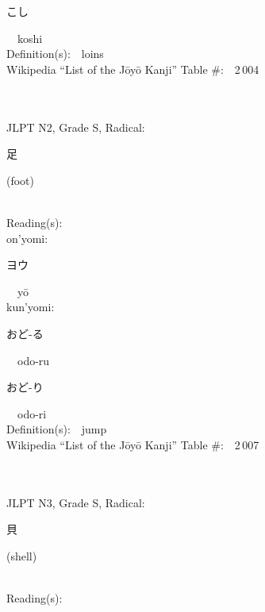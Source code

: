 \begin{multicols}{2}
{\hspace*{2em}}{\begin{CJK}{UTF8}{min} こし \end{CJK}}\ \ koshi\ \ \\
Definition(s):\ \ loins \\
Wikipedia ``List of the J\=oy\=o Kanji'' Table \#:\ \ 2\,004 \\
\ \ \\
{\fontsize{34pt}{40pt}  }\ \ \\  %
{JLPT N2, Grade S, Radical:\ \ {\begin{CJK}{UTF8}{min} 足 \end{CJK}} (foot) } \\
Reading(s):\ \ \\
{\hspace*{1em}}on'yomi:\ \ \\
{\hspace*{2em}}{\begin{CJK}{UTF8}{min} ヨウ \end{CJK}}\ \ y\=o\ \ \\
{\hspace*{1em}}kun'yomi:\ \ \\
{\hspace*{2em}}{\begin{CJK}{UTF8}{min} おど-る \end{CJK}}\ \ odo-ru\ \ \\
{\hspace*{2em}}{\begin{CJK}{UTF8}{min} おど-り \end{CJK}}\ \ odo-ri\ \ \\
Definition(s):\ \ jump \\
Wikipedia ``List of the J\=oy\=o Kanji'' Table \#:\ \ 2\,007 \\
\ \ \\
{\fontsize{34pt}{40pt}  }\ \ \\  %
{JLPT N3, Grade S, Radical:\ \ {\begin{CJK}{UTF8}{min} 貝 \end{CJK}} (shell) } \\
Reading(s):\ \ \\

\end{multicols}

